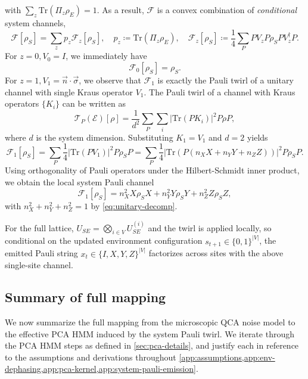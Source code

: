 \documentclass[
    aps,
    prx,
    reprint,
    superscriptaddress,
    longbibliography,
    nofootinbib,
    floatfix,
]{revtex4-2}
\newcommand{\Tr}{\mathrm{Tr}}
\begin{document}
with \(\sum_z \Tr(\Pi_z \rho_E) = 1\). As a result, \(\mathcal{F}\) is a convex combination of \emph{conditional} system channels,
\begin{equation}
    \mathcal{F}[\rho_S] = \sum_z p_z \mathcal{F}_z[\rho_S], \quad p_z \coloneq \Tr(\Pi_z \rho_E), \quad \mathcal{F}_z[\rho_S] \coloneq \frac{1}{4} \sum_P P V_z P \rho_S P V_z^\dagger P.
\end{equation}
For \(z=0, V_0 = I\), we immediately have
\begin{equation}
    \mathcal{F}_0[\rho_S] = \rho_S.
\end{equation}
For \(z=1, V_1 = \vec{n} \cdot \vec{\sigma}\), we observe that \(\mathcal{F}_1\) is exactly the Pauli twirl of a unitary channel with single Kraus operator \(V_1\). The Pauli twirl of a channel with Kraus operators \(\{K_i\}\) can be written as
\begin{equation}
    \mathcal{T}_P(\mathcal{E})[\rho] = \frac{1}{d^2} \sum_P \sum_i |\Tr(P K_i)|^2 P \rho P,
\end{equation}
where \(d\) is the system dimension. Substituting \(K_1 = V_1\) and \(d=2\) yields
\begin{equation}
    \mathcal{F}_1[\rho_S] 
    = \sum_P \frac{1}{4}|\Tr(PV_1)|^2 P \rho_S P 
    = \sum_P \frac{1}{4}|\Tr(P (n_X X + n_Y Y + n_Z Z))|^2 P \rho_S P.
\end{equation}
Using orthogonality of Pauli operators under the Hilbert-Schmidt inner product, we obtain the local system Pauli channel
\begin{equation}
    \mathcal{F}_1[\rho_S] = n_X^2 X \rho_S X + n_Y^2 Y \rho_S Y + n_Z^2 Z \rho_S Z,
\end{equation}
with \(n_X^2 + n_Y^2 + n_Z^2 = 1\) by \cref{eq:unitary-decomp}.

For the full lattice, \(U_{SE} = \bigotimes_{i\in V} U_{SE}^{(i)}\) and the twirl is applied locally, so conditional on the updated environment configuration \(s_{t+1} \in \{0,1\}^{|V|}\), the emitted Pauli string \(x_t \in \{I, X, Y, Z\}^{|V|}\) factorizes across sites with the above single-site channel.

\subsection{Summary of full mapping}\label{app:summary-mapping}
We now summarize the full mapping from the microscopic QCA noise model to the effective PCA HMM induced by the system Pauli twirl. We iterate through the PCA HMM steps as defined in \cref{sec:pca-details}, and justify each in reference to the assumptions and derivations throughout \cref{app:assumptions,app:env-dephasing,app:pca-kernel,app:system-pauli-emission}.
\end{document}
